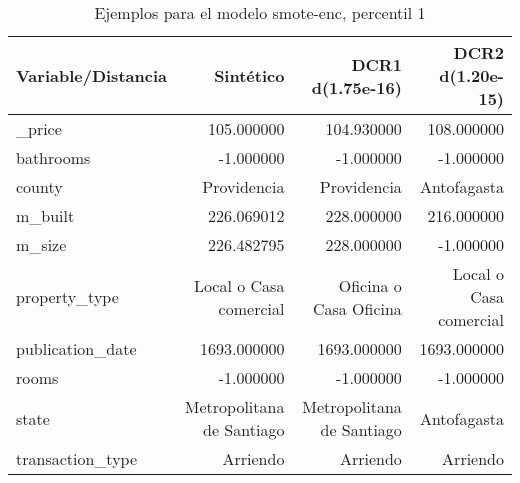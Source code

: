 \begin{table}[H]
\centering
\fontsize{10}{14}\selectfont
\caption{Ejemplos para el modelo smote-enc, percentil 1}
\label{table-example-economicos-b-2-smote-enc-1p}
\begin{tabular}{|l|r|r|r|}
\hline
\rowcolor[gray]{0.8}
Variable/Distancia & Sintético & DCR1 d(1.75e-16) & DCR2 d(1.20e-15) \\
\hline \_price & \cellcolor[rgb]{0.9, 0.54, 0.52} 105.000000 & 104.930000 & 108.000000 \\
\hline bathrooms & \cellcolor[rgb]{0.9, 0.54, 0.52} -1.000000 & \cellcolor[rgb]{0.9, 0.54, 0.52} -1.000000 & \cellcolor[rgb]{0.9, 0.54, 0.52} -1.000000 \\
\hline county & \cellcolor[rgb]{0.9, 0.54, 0.52} Providencia & \cellcolor[rgb]{0.9, 0.54, 0.52} Providencia & Antofagasta \\
\hline m\_built & \cellcolor[rgb]{0.9, 0.54, 0.52} 226.069012 & 228.000000 & 216.000000 \\
\hline m\_size & \cellcolor[rgb]{0.9, 0.54, 0.52} 226.482795 & 228.000000 & -1.000000 \\
\hline property\_type & \cellcolor[rgb]{0.9, 0.54, 0.52} Local o Casa comercial & Oficina o Casa Oficina & \cellcolor[rgb]{0.9, 0.54, 0.52} Local o Casa comercial \\
\hline publication\_date & \cellcolor[rgb]{0.9, 0.54, 0.52} 1693.000000 & \cellcolor[rgb]{0.9, 0.54, 0.52} 1693.000000 & \cellcolor[rgb]{0.9, 0.54, 0.52} 1693.000000 \\
\hline rooms & \cellcolor[rgb]{0.9, 0.54, 0.52} -1.000000 & \cellcolor[rgb]{0.9, 0.54, 0.52} -1.000000 & \cellcolor[rgb]{0.9, 0.54, 0.52} -1.000000 \\
\hline state & \cellcolor[rgb]{0.9, 0.54, 0.52} Metropolitana de Santiago & \cellcolor[rgb]{0.9, 0.54, 0.52} Metropolitana de Santiago & Antofagasta \\
\hline transaction\_type & \cellcolor[rgb]{0.9, 0.54, 0.52} Arriendo & \cellcolor[rgb]{0.9, 0.54, 0.52} Arriendo & \cellcolor[rgb]{0.9, 0.54, 0.52} Arriendo \\
\hline
\end{tabular}
\end{table}
